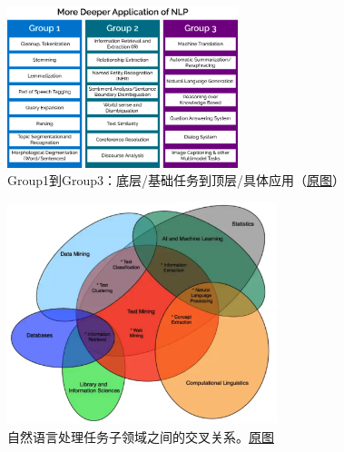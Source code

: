 \documentclass[lang=cn,11pt,a4paper]{elegant_template}
\begin{document}
\begin{figure}[htbp]
  \centering
  \vspace{-1cm}
  \includegraphics[width=0.6\textwidth]{image/nlp_3.png}
  \caption{Group1到Group3：底层/基础任务到顶层/具体应用（\href{https://www.packtpub.com/product/python-natural-language-processing/9781787121423}{原图}）}
\end{figure}

\begin{figure}[htbp]
  \centering
  \includegraphics[width=0.7\textwidth]{image/nlp_4.png}
  \caption{自然语言处理任务子领域之间的交叉关系。\href{https://bbds.ma/wp-content/uploads/2017/11/BBDS-Deep-Learning-NLP-Text-Mining-2.pdf}{原图}}
\end{figure}
\end{document}
